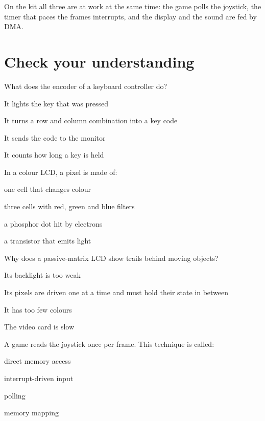 \begin{prgmachine}
On the kit all three are at work at the same time: the game polls the
joystick, the timer that paces the frames interrupts, and the display and the
sound are fed by DMA.
\end{prgmachine}





\section{Check your understanding}

\begin{quiz}{What does the encoder of a keyboard controller do?}
\item It lights the key that was pressed
\item It turns a row and column combination into a key code
\item It sends the code to the monitor
\item It counts how long a key is held
\end{quiz}

\begin{quiz}{In a colour LCD, a pixel is made of:}
\item one cell that changes colour
\item three cells with red, green and blue filters
\item a phosphor dot hit by electrons
\item a transistor that emits light
\end{quiz}

\begin{quiz}{Why does a passive-matrix LCD show trails behind moving objects?}
\item Its backlight is too weak
\item Its pixels are driven one at a time and must hold their state in between
\item It has too few colours
\item The video card is slow
\end{quiz}

\begin{quiz}{A \prg game reads the joystick once per frame. This technique is called:}
\item direct memory access
\item interrupt-driven input
\item polling
\item memory mapping
\end{quiz}

